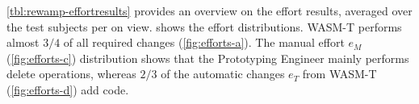 
\cref{tbl:rewamp-effortresults} provides an overview on the effort results, averaged over the test subjects per on view.
 shows the effort distributions.
WASM-T performs almost \(3/4\) of all required changes (\cref{fig:efforts-a}).
The manual effort \(e_M\) (\cref{fig:efforts-c}) distribution shows that the Prototyping Engineer mainly performs delete operations, whereas \(2/3\) of the automatic changes \(e_T\) from WASM-T (\cref{fig:efforts-d}) add code.

\begin{figure}
\centering


\end{figure}
